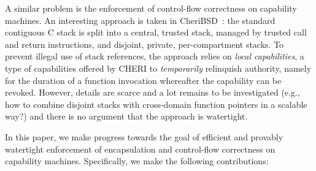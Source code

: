 \documentclass[compsoc,conference,letterpaper,fleqn]{IEEEtran}
\begin{document}
A similar problem is the enforcement of control-flow correctness on capability
machines. An interesting approach is taken in CheriBSD~\citep{Watson2015Cheri}:
the standard contiguous C stack is split into a central, trusted stack, managed
by trusted call and return instructions, and disjoint, private, per-compartment
stacks. To prevent illegal use of stack references, the approach relies on
\emph{local capabilities}, a type of capabilities offered by CHERI to
\emph{temporarily} relinquish authority, namely for the duration of a function
invocation whereafter the capability can be revoked. However, details are scarce
and a lot remains to be investigated (e.g., how to combine disjoint stacks with
cross-domain function pointers in a scalable way?) and there is no argument that
the approach is watertight.

In this paper, we make progress towards the goal of efficient and provably
watertight enforcement of encapsulation and control-flow correctness on
capability machines. Specifically, we make the following contributions:
\end{document}
